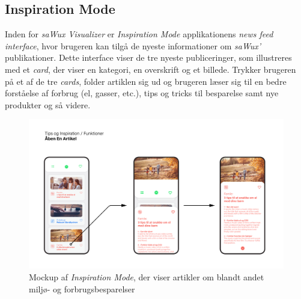 \subsection{Inspiration Mode}
Inden for \emph{saWux Visualizer} er \emph{Inspiration Mode} applikationens \emph{news feed interface}, hvor brugeren kan tilgå de nyeste informationer om \emph{saWux'} publikationer. Dette interface viser de tre nyeste publiceringer, som illustreres med et \emph{card}, der viser en kategori, en overskrift og et billede. Trykker brugeren på et af de tre \emph{cards}, folder artiklen sig ud og brugeren læser sig til en bedre forståelse af forbrug (el, gasser, etc.), tips og tricks til besparelse samt nye produkter og så videre.
\begin{figure}[H]
    \centering
    \includegraphics[width=\textwidth]{Images/Open An Article.png}
    \caption[\emph{Inspiration Mode} mockup]{Mockup af \emph{Inspiration Mode}, der viser artikler om blandt andet miljø- og forbrugsbesparelser}
    \label{img:teknisk:article}
\end{figure}
